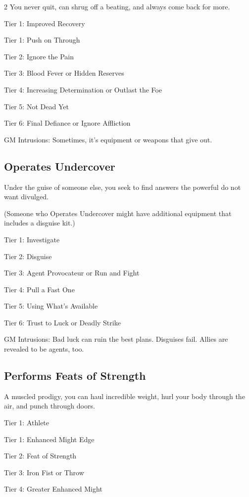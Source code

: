 \begin{multicols}{2}
You never quit, can shrug off a beating, and always come back for more.

Tier 1: Improved Recovery

Tier 1: Push on Through

Tier 2: Ignore the Pain

Tier 3: Blood Fever or Hidden Reserves

Tier 4: Increasing Determination or Outlast the Foe

Tier 5: Not Dead Yet

Tier 6: Final Defiance or Ignore Affliction

GM Intrusions: Sometimes, it’s equipment or weapons that give out.

\subsection{Operates Undercover}

Under the guise of someone else, you seek to find answers the powerful do not want divulged.

(Someone who Operates Undercover might have additional equipment that includes a disguise kit.)

Tier 1: Investigate

Tier 2: Disguise

Tier 3: Agent Provocateur or Run and Fight

Tier 4: Pull a Fast One

Tier 5: Using What’s Available

Tier 6: Trust to Luck or Deadly Strike

GM Intrusions: Bad luck can ruin the best plans. Disguises fail. Allies are revealed to be agents, too.

\subsection{Performs Feats of Strength}

A muscled prodigy, you can haul incredible weight, hurl your body through the air, and punch through doors.

Tier 1: Athlete

Tier 1: Enhanced Might Edge

Tier 2: Feat of Strength

Tier 3: Iron Fist or Throw

Tier 4: Greater Enhanced Might


\end{multicols}
